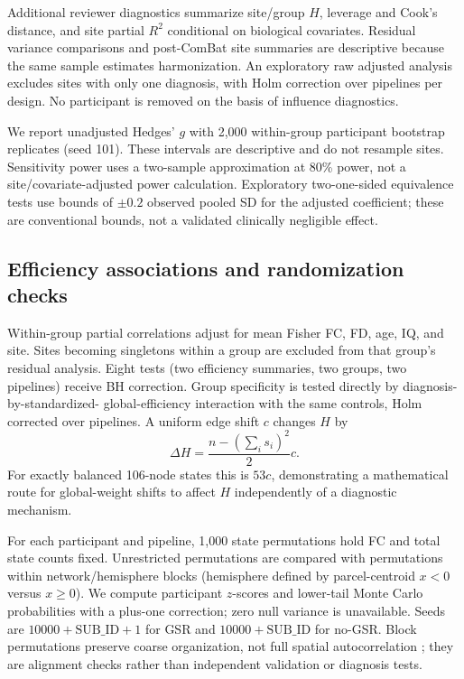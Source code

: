 \documentclass[10pt,letterpaper]{article}
\begin{document}
Additional reviewer diagnostics summarize site/group $H$, leverage and Cook's
distance, and site partial $R^2$ conditional on biological covariates. Residual
variance comparisons and post-ComBat site summaries are descriptive because the
same sample estimates harmonization. An exploratory raw adjusted analysis excludes
sites with only one diagnosis, with Holm correction over pipelines per design.
No participant is removed on the basis of influence diagnostics.

We report unadjusted Hedges' $g$ with 2,000 within-group participant bootstrap
replicates (seed 101). These intervals are descriptive and do not resample sites.
Sensitivity power uses a two-sample approximation at 80\% power, not a
site/covariate-adjusted power calculation. Exploratory two-one-sided equivalence
tests use bounds of $\pm0.2$ observed pooled SD for the adjusted coefficient;
these are conventional bounds, not a validated clinically negligible effect.

\subsection*{Efficiency associations and randomization checks}
Within-group partial correlations adjust for mean Fisher FC, FD, age, IQ, and site.
Sites becoming singletons within a group are excluded from that group's residual
analysis. Eight tests (two efficiency summaries, two groups, two pipelines) receive
BH correction. Group specificity is tested directly by diagnosis-by-standardized-
global-efficiency interaction with the same controls, Holm corrected over pipelines.
A uniform edge shift $c$ changes $H$ by
\begin{equation}
\Delta H=\frac{n-(\sum_i s_i)^2}{2}c.
\end{equation}
For exactly balanced 106-node states this is $53c$, demonstrating a mathematical
route for global-weight shifts to affect $H$ independently of a diagnostic mechanism.

For each participant and pipeline, 1,000 state permutations hold FC and total state
counts fixed. Unrestricted permutations are compared with permutations within
network/hemisphere blocks (hemisphere defined by parcel-centroid $x<0$ versus
$x\geq0$). We compute participant $z$-scores and lower-tail Monte Carlo probabilities
with a plus-one correction; zero null variance is unavailable. Seeds are
$10000+\mathrm{SUB\_ID}+1$ for GSR and $10000+\mathrm{SUB\_ID}$ for no-GSR.
Block permutations preserve coarse organization, not full spatial autocorrelation
\cite{Markello2021revision}; they are alignment checks rather than independent
validation or diagnosis tests.
\end{document}
